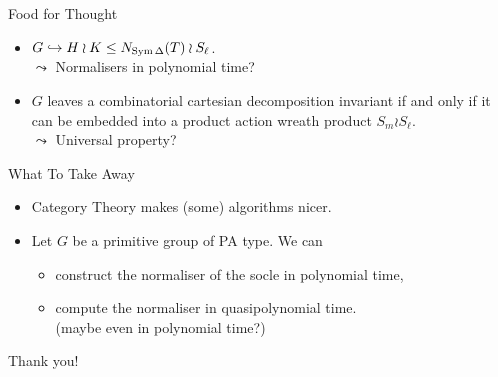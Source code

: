 \begin{frame}{Food for Thought}
    \begin{itemize}
        \setlength\itemsep{2em}
        \item
        $G \hookrightarrow H \wr K \leq N_{\operatorname{Sym} \Delta}(T) \wr S_ \ell$.
        \\
        \pause
        $\leadsto$ Normalisers in polynomial time?
        \pause
        \item
        $G$ leaves a combinatorial cartesian decomposition invariant
        if and only if it can be embedded into a product action wreath product
        $S_m \wr S_\ell$.
        \\
        \pause
        $\leadsto$ Universal property?
    \end{itemize}
\end{frame}

\begin{frame}{What To Take Away}
    \begin{itemize}
        \setlength\itemsep{2em}
        \item
        Category Theory makes (some) algorithms nicer.
        \pause
        \item
        Let $G$ be a primitive group of PA type. We can
        \pause
        \begin{itemize}
            \item
            construct the normaliser of the socle in polynomial time,
            \pause
            \item
            compute the normaliser in quasipolynomial time.
            \\
            \pause
            (maybe even in polynomial time?)
        \end{itemize}
    \end{itemize}
\end{frame}

\begin{frame}
    \centering
    \Large
    Thank you!
\end{frame}
